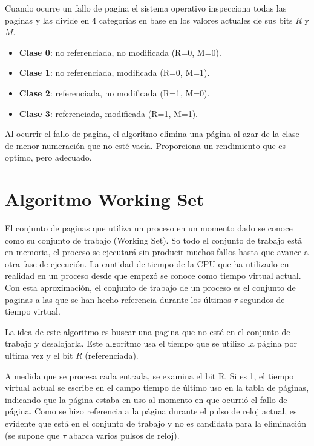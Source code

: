 \documentclass{article}
\begin{document}
Cuando ocurre un fallo de pagina el sistema operativo inspecciona todas las paginas y las divide en 4 categorías en base en los valores actuales de sus bits $R$ y $M$.

\begin{itemize}
	\item \textbf{Clase 0}: no referenciada, no modificada (R=0, M=0).
	
	\item \textbf{Clase 1}: no referenciada, modificada (R=0, M=1).
	
	\item \textbf{Clase 2}: referenciada, no modificada (R=1, M=0).
	
	\item \textbf{Clase 3}: referenciada, modificada (R=1, M=1).
\end{itemize}

Al ocurrir el fallo de pagina, el algoritmo elimina una página al azar de la clase de menor numeración que no esté vacía. Proporciona un rendimiento que es optimo, pero adecuado.


{\centering \section*{Algoritmo Working Set}}
El conjunto de paginas que utiliza un proceso en un momento dado se conoce como su conjunto de trabajo (Working Set). So todo el conjunto de trabajo está en memoria, el proceso se ejecutará sin producir muchos fallos hasta que avance a otra fase de ejecución. La cantidad de tiempo de la CPU que ha utilizado en realidad en un proceso desde que empezó se conoce como tiempo virtual actual. Con esta aproximación, el conjunto de trabajo de un proceso es el conjunto de paginas a las que se han hecho referencia durante los últimos $\tau$ segundos de tiempo virtual.

La idea de este algoritmo es buscar una pagina que no esté en el conjunto de trabajo y desalojarla. Este algoritmo usa el tiempo que se utilizo la página por ultima vez y el bit $R$ (referenciada).

A medida que se procesa cada entrada, se examina el bit R. Si es 1, el tiempo virtual actual se escribe en el campo tiempo de último uso en la tabla de páginas, indicando que la página estaba en uso al momento en que ocurrió el fallo de página. Como se hizo referencia a la página durante el pulso de reloj actual, es evidente que está en el conjunto de trabajo y no es candidata para la eliminación (se supone que $\tau$ abarca varios pulsos de reloj).
\end{document}
